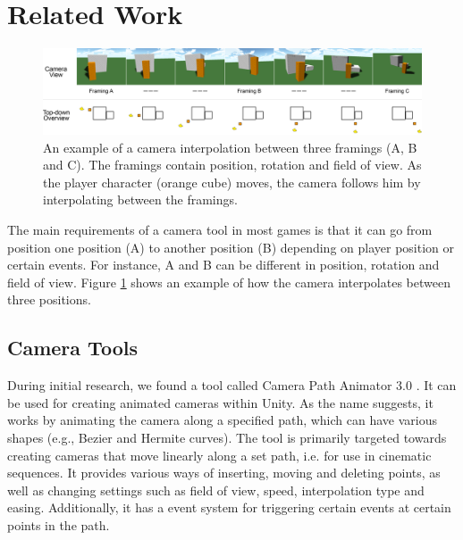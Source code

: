 \section{Related Work}\label{relatedWork}

\begin{figure}[htbp]
\centering
\includegraphics[width=1\textwidth]{Pics/InterpolationExample}
\caption{An example of a camera interpolation between three framings (A, B and C). The framings contain position, rotation and field of view. As the player character (orange cube) moves, the camera follows him by interpolating between the framings.}
\label{fig:InterpolationExample}
\end{figure}

The main requirements of a camera tool in most games is that it can go from position one position (A) to another  position (B) depending on player position or certain events. For instance, A and B can be different in position, rotation and field of view.
Figure \ref{fig:InterpolationExample} shows an example of how the camera interpolates between three positions.


\subsection{Camera Tools}

During initial research, we found a tool called Camera Path Animator 3.0 \cite{unity_camTool}. It can be used for creating animated cameras within Unity. As the name suggests, it works by animating the camera along a specified path, which can have various shapes (e.g., Bezier and Hermite curves). The tool is primarily targeted towards creating cameras that move linearly along a set path, i.e. for use in cinematic sequences. It provides various ways of inserting, moving and deleting points, as well as changing settings such as field of view, speed, interpolation type and easing. Additionally, it has a event system for triggering certain events at certain points in the path.

